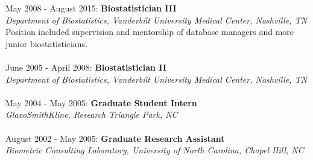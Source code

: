 \documentclass[5pt]{article}
\begin{document}
\noindent May 2008 - August 2015: \textbf{Biostatistician III}\\
\indent \emph{Department of Biostatistics, Vanderbilt University Medical Center, Nashville, TN} \\
\indent Position included supervision and mentorship of database managers and more junior biostatisticians. \\\\ %
\noindent June 2005 - April 2008: \textbf{Biostatistician II} \\
\indent \emph{Department of Biostatistics, Vanderbilt University Medical Center, Nashville, TN} \\
\\
\noindent May 2004 - May 2005: \textbf{Graduate Student Intern}\\
\indent \emph{GlaxoSmithKline, Research Triangle Park, NC}\\\\ %
\noindent August 2002 - May 2005: \textbf{Graduate Research Assistant}\\ \indent \emph{Biometric Consulting Laboratory, University of North Carolina, Chapel Hill, NC} %
\end{document}
